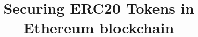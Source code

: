\documentclass[conference,compsoc]{IEEEtran}
\begin{document}
\title{Securing ERC20 Tokens in Ethereum blockchain}
\author{
	\IEEEauthorblockN{ }
	\IEEEauthorblockA{ }
}

\maketitle
		
\IEEEpeerreviewmaketitle









\end{document}
